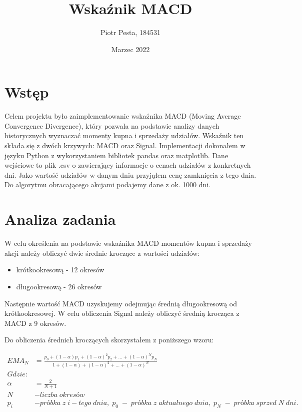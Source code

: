 \documentclass{article}
\title{Wskaźnik MACD}
\author{Piotr Pesta, 184531}
\date{Marzec 2022}
\begin{document}
\maketitle

\section{Wstęp}

    Celem projektu było zaimplementowanie wskaźnika MACD (Moving Average Convergence Divergence), który pozwala na podstawie analizy danych historycznych
    wyznaczać momenty kupna i sprzedaży udziałów. Wskaźnik ten składa się z dwóch krzywych: MACD oraz Signal.
    Implementacji dokonałem w języku Python z wykorzystaniem bibliotek pandas oraz matplotlib.
    Dane wejściowe to plik .csv o zawierający informacje o cenach udziałów z konkretnych dni. 
    Jako wartość udziałów w danym dniu przyjąłem cenę zamknięcia z tego dnia. Do algorytmu obracającego akcjami podajemy dane z ok. 1000 dni.

\section{Analiza zadania}

    W celu określenia na podstawie wskaźnika MACD momentów kupna i sprzedaży akcji należy obliczyć
    dwie średnie kroczące z wartości udziałów:
    \begin{itemize}
        \item krótkookresową - 12 okresów
        \item długookresową - 26 okresów
    \end{itemize}

    \noindent Następnie wartość MACD uzyskujemy odejmując średnią długookresową od krótkookresowej.
    W celu obliczenia Signal należy obliczyć średnią krocząca z MACD z 9 okresów. 


    Do obliczenia średnich kroczących skorzystałem z poniższego wzoru:
 
        

    \begin{align*} 
        EMA_{N} &= \frac{p_{0} + (1-\alpha)p_{1} + (1-\alpha)^2p_{2} + \ldots + (1-\alpha)^Np_{N}}{1 + (1-\alpha)+(1-\alpha)^2 + \ldots + (1-\alpha)^N} \\
        \mathit{Gdzie:} & \\
        \alpha &= \frac{2}{N + 1} \\
        N &- liczba \; okres \mathit{ó} w \\
        p_{i} &- pr\mathit{ó}bka \; z \; i-tego \;dnia, \;p_{0}\; - \; pr\mathit{ó}bka \;z \;aktualnego \;dnia, \;p_{N} \;-\;pr\mathit{ó}bka \;sprzed \;N \;dni.
    \end{align*}
\end{document}
